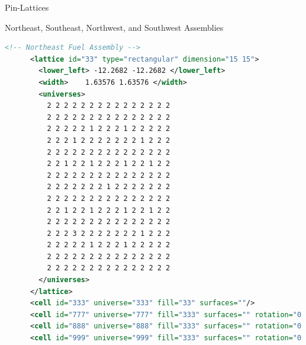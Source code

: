 \begin{frame}[fragile]{Pin-Lattices}

  \centering

  Northeast, Southeast, Northwest, and Southwest Assemblies

  \begin{scriptsize}
    \begin{lstlisting}[language=XML,gobble=4]
      <!-- Northeast Fuel Assembly -->      
      <lattice id="33" type="rectangular" dimension="15 15">
        <lower_left> -12.2682 -12.2682 </lower_left>
        <width>    1.63576 1.63576 </width>
        <universes>
          2 2 2 2 2 2 2 2 2 2 2 2 2 2 2
          2 2 2 2 2 2 2 2 2 2 2 2 2 2 2
          2 2 2 2 2 1 2 2 2 1 2 2 2 2 2
          2 2 2 1 2 2 2 2 2 2 2 1 2 2 2
          2 2 2 2 2 2 2 2 2 2 2 2 2 2 2
          2 2 1 2 2 1 2 2 2 1 2 2 1 2 2
          2 2 2 2 2 2 2 2 2 2 2 2 2 2 2
          2 2 2 2 2 2 2 1 2 2 2 2 2 2 2
          2 2 2 2 2 2 2 2 2 2 2 2 2 2 2
          2 2 1 2 2 1 2 2 2 1 2 2 1 2 2
          2 2 2 2 2 2 2 2 2 2 2 2 2 2 2
          2 2 2 3 2 2 2 2 2 2 2 1 2 2 2
          2 2 2 2 2 1 2 2 2 1 2 2 2 2 2
          2 2 2 2 2 2 2 2 2 2 2 2 2 2 2
          2 2 2 2 2 2 2 2 2 2 2 2 2 2 2
        </universes>
      </lattice>
      <cell id="333" universe="333" fill="33" surfaces=""/>                     <!-- NE -->
      <cell id="777" universe="777" fill="333" surfaces="" rotation="0 0 90"/>  <!-- NW -->
      <cell id="888" universe="888" fill="333" surfaces="" rotation="0 0 180"/> <!-- SE -->
      <cell id="999" universe="999" fill="333" surfaces="" rotation="0 0 270"/> <!-- SW -->
    \end{lstlisting}
  \end{scriptsize}
  
\end{frame}


